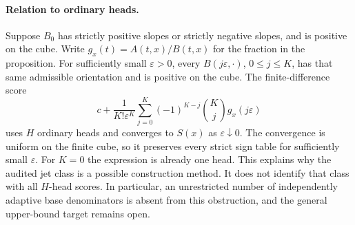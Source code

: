 \documentclass[11pt]{article}
\begin{document}
\paragraph{Relation to ordinary heads.}
Suppose $B_0$ has strictly positive slopes or strictly negative
slopes, and is positive on the cube. Write $g_x(t)=A(t,x)/B(t,x)$
for the fraction in the proposition. For sufficiently small
$\varepsilon>0$, every $B(j\varepsilon,\cdot)$, $0\le j\le K$,
has that same admissible orientation and is positive on the cube.
The finite-difference score
\[
 c+\frac1{K!\varepsilon^K}
 \sum_{j=0}^K(-1)^{K-j}\binom Kj g_x(j\varepsilon)
\]
uses $H$ ordinary heads and converges to $S(x)$ as
$\varepsilon\downarrow0$. The convergence is uniform on the finite
cube, so it preserves every strict sign table for sufficiently small
$\varepsilon$. For $K=0$ the expression is already one head.
This explains why the audited jet class is a possible construction
method. It does not identify that class with all $H$-head scores.
In particular, an unrestricted number of independently adaptive base
denominators is absent from this obstruction, and the general
upper-bound target remains open.
\end{document}
